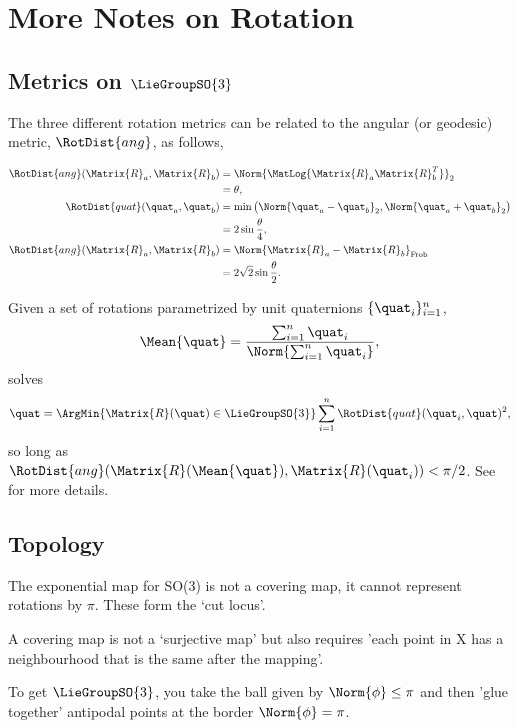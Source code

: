 \chapter{More Notes on Rotation}
\label{chap:appendix_rot_dist}

\section{Metrics on $\LieGroupSO{3}$}
The three different rotation metrics can be related to the angular (or geodesic) metric, $\RotDist{ang}$, as follows,

\begin{align}
\RotDist{ang}(\Matrix{R}_a, \Matrix{R}_b) &= \Norm{\MatLog{\Matrix{R}_a \Matrix{R}_b^T}}_2 
\\
 &= \theta,	
\\
\RotDist{quat}(\quat_a, \quat_b) &= \min\left( \Norm{\quat_a - \quat_b}_2, \Norm{\quat_a + \quat_b}_2 \right) 
\\ &= 2 \sin{\frac{\theta}{4}},	
\\
\RotDist{ang}(\Matrix{R}_a, \Matrix{R}_b) &= \Norm{\Matrix{R}_a - \Matrix{R}_b}_\mathrm{Frob} \\	 
&= 2\sqrt{2} \sin{\frac{\theta}{2}}.
\end{align}

Given a set of rotations parametrized by unit quaternions $\{\quat_i\}_{i=1}^n$,
\begin{equation}
\Mean{\quat} = \frac{\sum_{i=1}^n \quat_i}{\Norm{\sum_{i=1}^n \quat_i}},	
\end{equation}
solves
\begin{equation}
\quat = \ArgMin{\Matrix{R}(\quat) \in \LieGroupSO{3}} \sum_{i=1}^n \RotDist{quat}(\quat_i, \quat)^2	,
\end{equation}
so long as $\RotDist{ang}(\Matrix{R}(\Mean{\quat}), \Matrix{R}(\quat_i)) < \pi/2$. See \cite{Hartley2013-rc} for more details.

\section{Topology}

The exponential map for SO(3) is not a covering map, it cannot represent rotations by $\pi$. These form the ‘cut locus’. 

A covering map is not a ‘surjective map’ but also requires 'each point in X has a neighbourhood  that is the same after the mapping'.

To get  $\LieGroupSO{3}$, you take the ball given by $\Norm{\phi} \leq \pi$ and then 'glue together' antipodal points at the border $\Norm{\phi} = \pi$.


